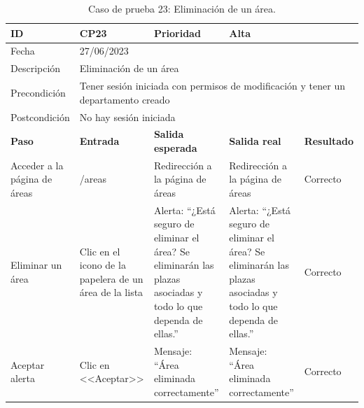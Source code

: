 \begin{table}[H]
\small
\begin{tabular}{p{} p{} p{} p{} p{}}
\cellcolor{gray!25}
ID   & CP23 & \cellcolor{gray!25} Prioridad   & Alta \\ \hline
\cellcolor{gray!25} Fecha	&	\multicolumn{4}{l}{27/06/2023} \\ \hline
\cellcolor{gray!25} Descripción		&	\multicolumn{4}{l}{Eliminación de un área} \\ \hline                                            
\cellcolor{gray!25}
Precondición  & \multicolumn{4}{p{.66\textwidth}}{Tener sesión iniciada con permisos de modificación y tener un departamento creado} \\ \hline
\cellcolor{gray!25} Postcondición & \multicolumn{4}{l}{No hay sesión iniciada}                                                    \\ \hline
\rowcolor{gray!25}
\textbf{Paso}   & \textbf{Entrada} & \textbf{Salida esperada} & \textbf{Salida real} & \textbf{Resultado} \\ \hline
Acceder a la página de áreas
& /areas                                                                          
& Redirección a la página de áreas                                  
& Redirección a la página de áreas                                   
& Correcto                            
\\ \hline
Eliminar un área
& Clic en el icono de la papelera de un área de la lista
& Alerta: ``¿Está seguro de eliminar el área? Se eliminarán las plazas asociadas y todo lo que dependa de ellas.''
& Alerta: ``¿Está seguro de eliminar el área? Se eliminarán las plazas asociadas y todo lo que dependa de ellas.''
& Correcto
\\ \hline
Aceptar alerta
& Clic en <<Aceptar>>
& Mensaje: ``Área eliminada correctamente'' 
& Mensaje: ``Área eliminada correctamente'' 
& Correcto
\\ \hline             
\end{tabular}
\caption{Caso de prueba 23: Eliminación de un área.}\label{table:CP23}
\end{table}

